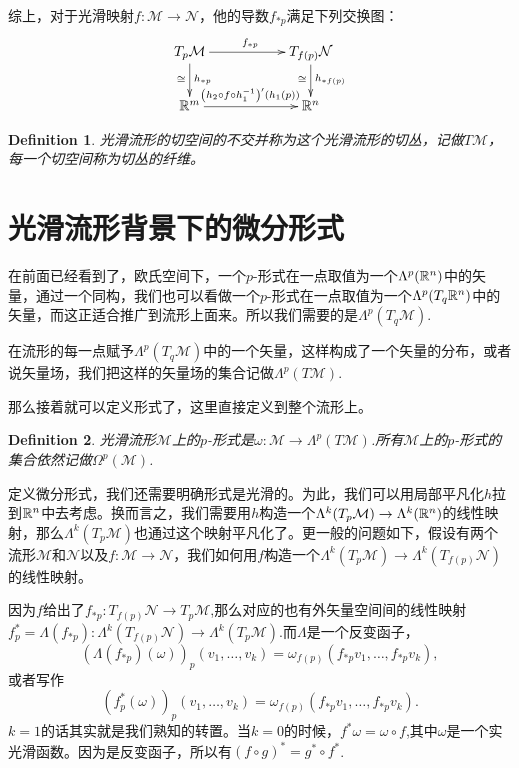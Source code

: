 \documentclass[11pt]{extbook}
\theoremstyle{plain}%
\newtheorem{defi}{Definition}[section]%
\begin{document}
综上，对于光滑映射$f:\mathcal{M}\to \mathcal{N}$，他的导数$f_{*p}$满足下列交换图：
	\[
		\xymatrix{
T_{p}\mathcal{M}\ar[d]_\cong^{h_{*p}}\ar[rr]^{f_{*p}}&&T_{f(p)}\mathcal{N}\ar[d]_\cong^{h_{*f(p)}}\\
		\rr^m\ar[rr]^{\left(h_2\circ f\circ h_1^{-1}\right)'(h_1(p))}&&\rr^n
		}
	\]
\begin{defi}
光滑流形的切空间的不交并称为这个光滑流形的切丛，记做$T\mathcal{M}$，每一个切空间称为切丛的纤维。
\end{defi}
\section{光滑流形背景下的微分形式}
在前面已经看到了，欧氏空间下，一个$p$-形式在一点取值为一个$\Lambda^p(\mathbb{R}^n)$中的矢量，通过一个同构，我们也可以看做一个$p$-形式在一点取值为一个$\Lambda^p(T_q\mathbb{R}^n)$中的矢量，而这正适合推广到流形上面来。所以我们需要的是$\Lambda^p(T_q\mathcal{M})$.

在流形的每一点赋予$\Lambda^p(T_q\mathcal{M})$中的一个矢量，这样构成了一个矢量的分布，或者说矢量场，我们把这样的矢量场的集合记做$\Lambda^p(T\mathcal{M})$.

那么接着就可以定义形式了，这里直接定义到整个流形上。
\begin{defi}
光滑流形$\mathcal{M}$上的$p$-形式是$\omega:\mathcal{M} \to \Lambda^p(T\mathcal{M})$.所有$\mathcal{M}$上的$p$-形式的集合依然记做$\Omega^p(\mathcal{M})$.
\end{defi}
定义微分形式，我们还需要明确形式是光滑的。为此，我们可以用局部平凡化$h$拉到$\mathbb{R}^n$中去考虑。换而言之，我们需要用$h$构造一个$\Lambda^k(T_p\mathcal{M})\to\Lambda^k(\mathbb{R}^n)$的线性映射，那么$\Lambda^k(T_p\mathcal{M})$也通过这个映射平凡化了。更一般的问题如下，假设有两个流形$\mathcal{M}$和$\mathcal{N}$以及$f:\mathcal{M}\to \mathcal{N}$，我们如何用$f$构造一个$\Lambda^k(T_p\mathcal{M}) \to \Lambda^k(T_{f(p)}\mathcal{N})$的线性映射。

因为$f$给出了$f_{*p}:T_{f(p)}\mathcal{N}\to T_{p}\mathcal{M}$,那么对应的也有外矢量空间间的线性映射
$f^*_{p}=\Lambda\left(f_{*p}\right):\Lambda^k\left(T_{f(p)}\mathcal{N}\right)\to \Lambda^k\left(T_{p}\mathcal{M}\right)$.而$\Lambda$是一个反变函子，
\[
(\Lambda\left(f_{*p}\right)\left(\omega\right))_p(v_1,\dots,v_k)=\omega_{f(p)}\left(f_{*p}v_1,\dots,f_{*p}v_k\right),
\]
或者写作
\[
(f_{p}^*\left(\omega\right))_p(v_1,\dots,v_k)=\omega_{f(p)}\left(f_{*p}v_1,\dots,f_{*p}v_k\right).
\]
$k=1$的话其实就是我们熟知的转置。当$k=0$的时候，$f^*\omega=\omega\circ f$,其中$\omega$是一个实光滑函数。因为是反变函子，所以有$(f\circ g)^*=g^*\circ f^*$.
\end{document}
